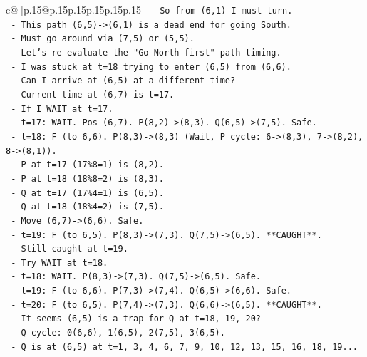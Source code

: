 \documentclass{article}
\begin{document}
{\begin{supertabular}{c@{$\;$}|p{.15\linewidth}@{}p{.15\linewidth}p{.15\linewidth}p{.15\linewidth}p{.15\linewidth}p{.15\linewidth}}
{{{\texttt{            {-} So from (6,1) I must turn.} \\
\texttt{            {-} This path (6,5){-}>(6,1) is a dead end for going South.} \\
\texttt{            {-} Must go around via (7,5) or (5,5).} \\
\texttt{            {-} Let's re{-}evaluate the "Go North first" path timing.} \\
\texttt{            {-} I was stuck at t=18 trying to enter (6,5) from (6,6).} \\
\texttt{            {-} Can I arrive at (6,5) at a different time?} \\
\texttt{            {-} Current time at (6,7) is t=17.} \\
\texttt{            {-} If I WAIT at t=17.} \\
\texttt{            {-} t=17: WAIT. Pos (6,7). P(8,2){-}>(8,3). Q(6,5){-}>(7,5). Safe.} \\
\texttt{            {-} t=18: F (to 6,6). P(8,3){-}>(8,3) (Wait, P cycle: 6{-}>(8,3), 7{-}>(8,2), 8{-}>(8,1)).} \\
\texttt{                {-} P at t=17 (17\%8=1) is (8,2).} \\
\texttt{                {-} P at t=18 (18\%8=2) is (8,3).} \\
\texttt{                {-} Q at t=17 (17\%4=1) is (6,5).} \\
\texttt{                {-} Q at t=18 (18\%4=2) is (7,5).} \\
\texttt{                {-} Move (6,7){-}>(6,6). Safe.} \\
\texttt{            {-} t=19: F (to 6,5). P(8,3){-}>(7,3). Q(7,5){-}>(6,5). **CAUGHT**.} \\
\texttt{            {-} Still caught at t=19.} \\
\texttt{            {-} Try WAIT at t=18.} \\
\texttt{            {-} t=18: WAIT. P(8,3){-}>(7,3). Q(7,5){-}>(6,5). Safe.} \\
\texttt{            {-} t=19: F (to 6,6). P(7,3){-}>(7,4). Q(6,5){-}>(6,6). Safe.} \\
\texttt{            {-} t=20: F (to 6,5). P(7,4){-}>(7,3). Q(6,6){-}>(6,5). **CAUGHT**.} \\
\texttt{            {-} It seems (6,5) is a trap for Q at t=18, 19, 20?} \\
\texttt{            {-} Q cycle: 0(6,6), 1(6,5), 2(7,5), 3(6,5).} \\
\texttt{            {-} Q is at (6,5) at t=1, 3, 4, 6, 7, 9, 10, 12, 13, 15, 16, 18, 19...} \\
}}}
\end{supertabular}}
\end{document}
